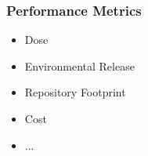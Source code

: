 
\begin{frame}[ctb!]
  \frametitle{Performance Metrics}
  \begin{itemize}
  \item Dose
  \item Environmental Release 
  \item Repository Footprint
  \item Cost
  \item ...
\end{itemize}
\end{frame}
